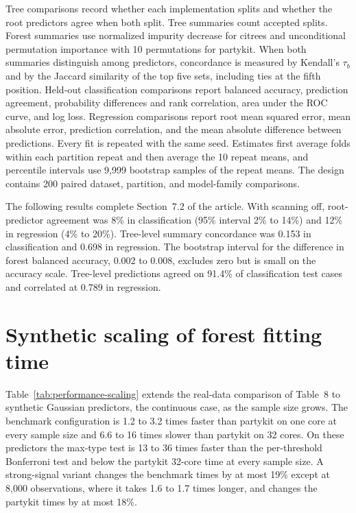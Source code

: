 \documentclass[11pt]{article}
\newcommand{\pkg}[1]{{\normalfont\fontseries{b}\selectfont #1}}
\newcommand{\citrees}{\pkg{citrees}\xspace}
\begin{document}
Tree comparisons record whether each implementation splits and whether the
root predictors agree when both split. Tree summaries count accepted splits.
Forest summaries use normalized impurity decrease for \citrees and
unconditional permutation importance with 10 permutations for \pkg{partykit}.
When both summaries distinguish among predictors, concordance is measured by
Kendall's $\tau_b$ and by the Jaccard similarity of the top five sets,
including ties at the fifth position. Held-out classification comparisons
report balanced accuracy, prediction agreement, probability differences and
rank correlation, area under the ROC curve, and log loss. Regression
comparisons report root mean squared error, mean absolute error, prediction
correlation, and the mean absolute difference between predictions. Every fit
is repeated with the same seed. Estimates first average folds within each
partition repeat and then average the 10 repeat means, and percentile
intervals use 9,999 bootstrap samples of the repeat means. The design
contains 200 paired dataset, partition, and model-family comparisons.

The following results complete Section~7.2 of the article. With scanning
off, root-predictor agreement was 8\% in classification (95\% interval 2\% to
14\%) and 12\% in regression (4\% to 20\%). Tree-level summary concordance
was 0.153 in classification and 0.698 in regression. The bootstrap interval
for the difference in forest balanced accuracy, 0.002 to 0.008, excludes zero
but is small on the accuracy scale. Tree-level predictions agreed on 91.4\%
of classification test cases and correlated at 0.789 in regression.

\section{Synthetic scaling of forest fitting time} \label{sec:scaling}

Table~\ref{tab:performance-scaling} extends the real-data comparison of
Table~8 to synthetic Gaussian predictors, the continuous case, as the sample
size grows. The benchmark configuration is 1.2 to 3.2 times faster than
\pkg{partykit} on one core at every sample size and 6.6 to 16 times slower
than \pkg{partykit} on 32 cores. On these predictors the max-type test is 13
to 36 times faster than the per-threshold Bonferroni test and below the
\pkg{partykit} 32-core time at every sample size. A strong-signal variant
changes the benchmark times by at most 19\% except at 8,000 observations,
where it takes 1.6 to 1.7 times longer, and changes the \pkg{partykit} times
by at most 18\%.
\end{document}
